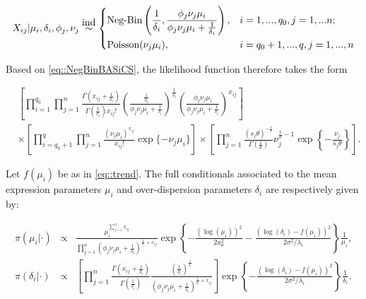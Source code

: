 \begin{equation} \label{eq::NegBinBASiCS}
 X_{ij}|\mu_i,\delta_i,\phi_j,\nu_j \stackrel{\mbox{ind}}{\sim}
 \left\lbrace
  \begin{aligned}
    &\textnormal{Neg-Bin}\left(\frac{1}{\delta_i},\frac{\phi_j\nu_j\mu_i}{\phi_j\nu_j\mu_i+\frac{1}{\delta_i}}\right), && i=1,...,q_0,j=1,...n;  \\ 
    &\textnormal{Poisson}(\nu_j\mu_i), && i=q_0+1,...,q,j=1,...,n        
  \end{aligned}
\right.
\end{equation}

Based on \ref{eq::NegBinBASiCS}, the likelihood function therefore takes the form

\begin{align} \label{eq::loglik}
& \left[\prod_{i=1}^{q_0}\prod_{j=1}^n\frac{\Gamma(x_{ij}+\frac{1}{\delta_i})}{\Gamma(\frac{1}{\delta_i})x_{ij}!}\left(\frac{\frac{1}{\delta_i}}{\phi_j\nu_j\mu_i+\frac{1}{\delta_i}}\right)^\frac{1}{\delta_i}\left(\frac{\phi_j\nu_j\mu_i}{\phi_j\nu_j\mu_i+\frac{1}{\delta_i}}\right)^{x_{ij}}\right] \nonumber\\ 
&\times\left[\prod_{i=q_0+1}^{q}\prod_{j=1}^n\frac{(\nu_j\mu_i)^{x_{ij}}}{x_{ij}!}\exp\lbrace-\nu_j\mu_i\rbrace\right]\times{}\left[\prod_{j=1}^n\frac{(s_j\theta)^{-\frac{1}{\theta}}}{\Gamma(\frac{1}{\theta})}\nu_j^{\frac{1}{\theta}-1}\exp\left\lbrace-\frac{\nu_j}{s_j\theta}\right\rbrace\right].
\end{align} 

Let $f(\mu_i)$ be as in \ref{eq::trend}. The full conditionals associated to the mean expression parameters $\mu_i$ and over-dispersion parameters $\delta_i$ are respectively given by:

\begin{footnotesize} \begin{eqnarray} \label{eq::FullCondMuDelta}
\pi(\mu_i|\cdot) & \propto & \frac{\mu_i^{\sum_{j=1}^n{}x_{ij}}}{\prod_{j=1}^n{}(\phi_j\nu_j\mu_i+\frac{1}{\delta_i})^{\frac{1}{\delta_i}+x_{ij}}} \exp\left\{-\frac{(\log(\mu_i))^2}{2a_\mu^2}-\frac{(\log(\delta_i)-f(\mu_i))^2}{2\sigma^2 / \lambda_i }\right\} \frac{1}{\mu_i}, \\
\pi(\delta_i|\cdot) & \propto & \left[\prod_{j=1}^n\frac{\Gamma(x_{ij}+\frac{1}{\delta_i})}{\Gamma(\frac{1}{\delta_i})}\frac{(\frac{1}{\delta_i})^{\frac{1}{\delta_i}}}{(\phi_j\nu_j\mu_i+\frac{1}{\delta_i})^{\frac{1}{\delta_i}+x_{ij}}}\right] \exp\left\{-\frac{(\log(\delta_i)-f(\mu_i))^2}{2\sigma^2 / \lambda_i}\right\} \frac{1}{\delta_i}.
\end{eqnarray} \end{footnotesize}


